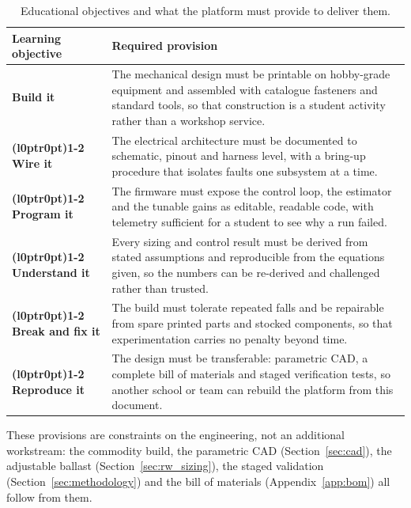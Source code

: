 \begin{table}[htbp]
\centering
\caption[Educational objective-to-provision traceability]{Educational objectives and what the platform must provide to deliver them.}
\label{tab:edu_traceability}
\renewcommand{\arraystretch}{1.15}
\begin{tabular}{@{}>{\bfseries}p{}p{}@{}}
\toprule
\textnormal{Learning objective} & Required provision \\
\midrule
Build it            & The mechanical design must be printable on hobby-grade equipment and assembled with catalogue fasteners and standard tools, so that construction is a student activity rather than a workshop service. \\
\addlinespace[0.35em] \cmidrule(l{0pt}r{0pt}){1-2} \addlinespace[0.35em]
Wire it             & The electrical architecture must be documented to schematic, pinout and harness level, with a bring-up procedure that isolates faults one subsystem at a time. \\
\addlinespace[0.35em] \cmidrule(l{0pt}r{0pt}){1-2} \addlinespace[0.35em]
Program it          & The firmware must expose the control loop, the estimator and the tunable gains as editable, readable code, with telemetry sufficient for a student to see why a run failed. \\
\addlinespace[0.35em] \cmidrule(l{0pt}r{0pt}){1-2} \addlinespace[0.35em]
Understand it       & Every sizing and control result must be derived from stated assumptions and reproducible from the equations given, so the numbers can be re-derived and challenged rather than trusted. \\
\addlinespace[0.35em] \cmidrule(l{0pt}r{0pt}){1-2} \addlinespace[0.35em]
Break and fix it    & The build must tolerate repeated falls and be repairable from spare printed parts and stocked components, so that experimentation carries no penalty beyond time. \\
\addlinespace[0.35em] \cmidrule(l{0pt}r{0pt}){1-2} \addlinespace[0.35em]
Reproduce it        & The design must be transferable: parametric CAD, a complete bill of materials and staged verification tests, so another school or team can rebuild the platform from this document. \\
\bottomrule
\end{tabular}
\end{table}

These provisions are constraints on the engineering, not an additional
workstream: the commodity build, the parametric CAD
(Section~\ref{sec:cad}), the adjustable ballast
(Section~\ref{sec:rw_sizing}), the staged validation
(Section~\ref{sec:methodology}) and the bill of materials
(Appendix~\ref{app:bom}) all follow from them.